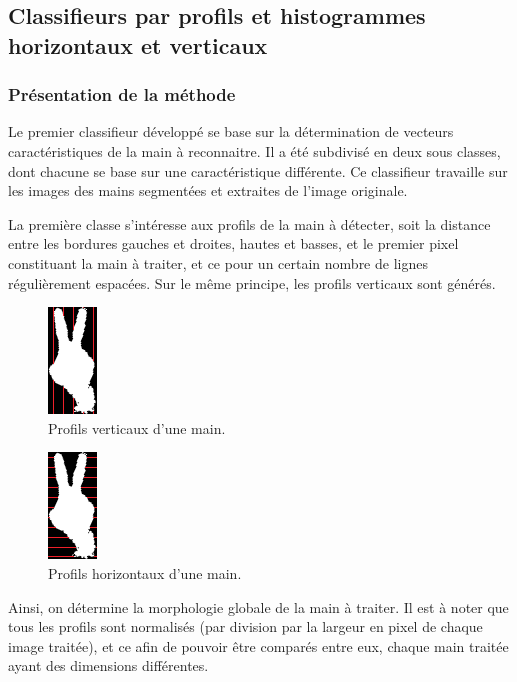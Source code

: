 ﻿\subsection{Classifieurs par profils et histogrammes horizontaux et verticaux}
\subsubsection{Présentation de la méthode}
Le premier classifieur développé se base sur la détermination de vecteurs caractéristiques de la main à reconnaitre. Il a été subdivisé en deux sous classes, dont chacune se base sur une caractéristique différente. Ce classifieur travaille sur les images des mains segmentées et extraites de l'image originale.

La première classe s'intéresse aux profils de la main à détecter, soit la distance entre les bordures gauches et droites, hautes et basses, et le premier pixel constituant la main à traiter, et ce pour un certain nombre de lignes régulièrement espacées. Sur le même principe, les profils verticaux sont générés.

\begin{figure}[htb!]
\centerline{\includegraphics{profilsVert.png}}
\caption{Profils verticaux d'une main.}
\end{figure}

\begin{figure}[htb!]
\centerline{\includegraphics{profilsHoriz.png}}
\caption{Profils horizontaux d'une main.}
\end{figure}

Ainsi, on détermine la morphologie globale de la main à traiter. Il est à noter que tous les profils sont normalisés (par division par la largeur en pixel de chaque image traitée), et ce afin de pouvoir être comparés entre eux, chaque main traitée ayant des dimensions différentes.

